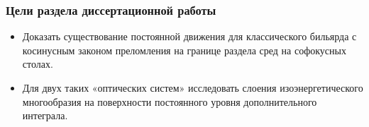 \begin{frame}
\frametitle{Цели раздела диссертационной работы}
\begin{itemize}
  \item Доказать существование постоянной движения для  классического бильярда с косинусным законом преломления на границе раздела сред на софокусных столах.
 \item Для двух таких «оптических систем» исследовать слоения изоэнергетического многообразия на поверхности постоянного уровня дополнительного интеграла.
\end{itemize}
\end{frame}

%
%
%
%
%
%
%


